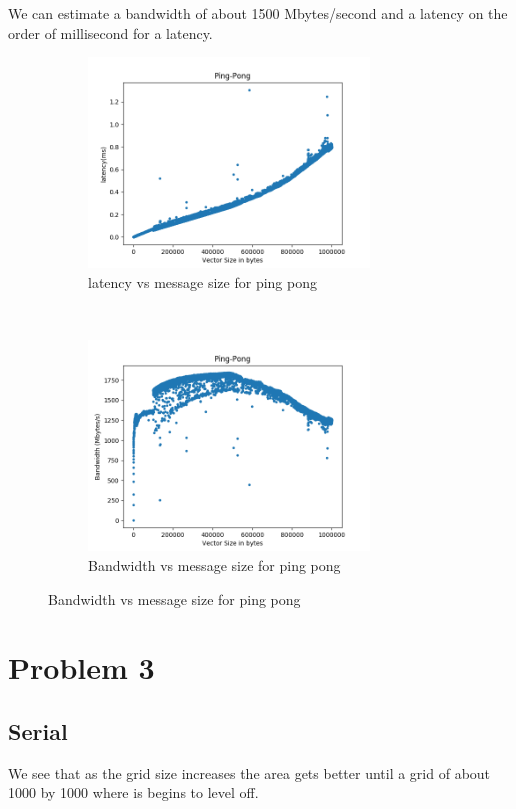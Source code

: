 \documentclass[12pt]{article}
\theoremstyle{plain}
\theoremstyle{definition}
\begin{document}
We can estimate a bandwidth of about 1500 Mbytes/second and a latency on the order of millisecond for a latency.
\begin{figure}[t]
    \centering
    \begin{subfigure}[t]{0.5\textwidth}
        \centering
        \includegraphics[height=2.2in]{latency.png}
        \caption{latency vs message size for ping pong}
    \end{subfigure}%
    ~
    \begin{subfigure}[t]{0.5\textwidth}
        \centering
        \includegraphics[height=2.2in]{bandwidth.png}
        \caption{Bandwidth vs message size for ping pong}
    \end{subfigure}
\end{figure}



\section*{Problem 3}

\subsection*{Serial}


We see that as the grid size increases the area gets better until a grid of about 1000 by 1000 where is begins to level off.
\end{document}
